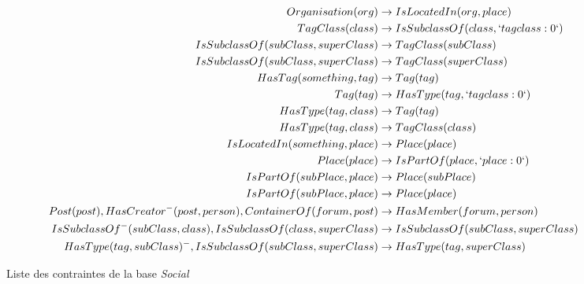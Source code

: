 \begin{figure}[H]
\begin{adjustbox}{max width=\linewidth,max height=.5\textheight}
{\begin{align*}
            Organisation(org) &\to IsLocatedIn(org, place) \\
            TagClass(class) &\to IsSubclassOf(class, `tagclass:0`) \\
            IsSubclassOf(subClass, superClass) &\to TagClass(subClass) \\
            IsSubclassOf(subClass, superClass) &\to TagClass(superClass) \\
            HasTag(something, tag) &\to Tag(tag) \\
            Tag(tag) &\to HasType(tag, `tagclass:0`) \\
            HasType(tag, class) &\to Tag(tag) \\
            HasType(tag, class) &\to TagClass(class) \\
            IsLocatedIn(something, place) &\to Place(place) \\
            Place(place) &\to IsPartOf(place, `place:0`) \\
            IsPartOf(subPlace, place) &\to Place(subPlace) \\
            IsPartOf(subPlace, place) &\to Place(place) \\
            Post(post), HasCreator^-(post, person), ContainerOf(forum, post) &\to HasMember(forum, person) \\
            IsSubclassOf^-(subClass, class), IsSubclassOf(class, superClass) &\to IsSubclassOf(subClass, superClass) \\
            HasType(tag, subClass)^-, IsSubclassOf(subClass, superClass) &\to HasType(tag, superClass)
        \end{align*}}
    \end{adjustbox}
    \caption{Liste des contraintes de la base \textit{Social}}
\end{figure}
